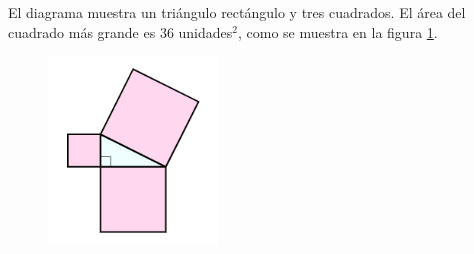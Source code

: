 El diagrama muestra un triángulo rectángulo y tres cuadrados.
El área del cuadrado más grande es 36 unidades$^2$, como se muestra en la figura \ref{fig:area13}.
\begin{figure}[H]
    \begin{center}
        \includegraphics[width=0.4\textwidth]{../images/area13.png}
    \end{center}
    \caption{}
    \label{fig:area13}
\end{figure}


